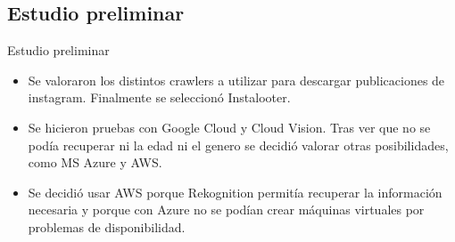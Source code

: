\documentclass[aspectratio=149]{beamer}
\begin{document}
\subsection{Estudio preliminar}
\begin{frame}[label=preliminar]{Estudio preliminar}
    \begin{itemize}
        \item Se valoraron los distintos crawlers a utilizar para descargar publicaciones de instagram. Finalmente se seleccionó Instalooter.
        \item Se hicieron pruebas con Google Cloud y Cloud Vision. Tras ver que no se podía recuperar ni la edad ni el genero se decidió valorar otras posibilidades, como MS Azure y AWS.
        \item Se decidió usar AWS porque Rekognition permitía recuperar la información necesaria y porque con Azure no se podían crear máquinas virtuales por problemas de disponibilidad.
    \end{itemize}
\end{frame}
\end{document}
